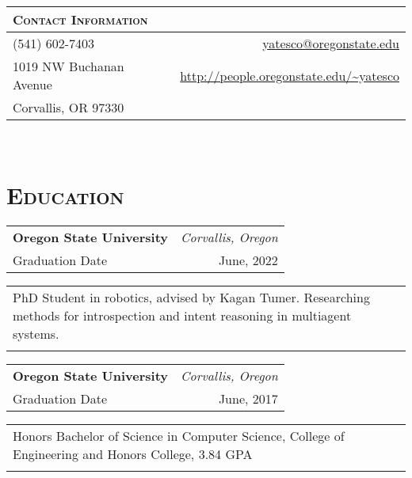 \documentclass[letterpaper,10pt,titlepage]{article}
\begin{document}
\pagestyle{empty}%
\par{\bigskip\par}%

\begin{tabularx}{\linewidth}{Xr}%
\textsc{Contact Information} & \\\hline
(541) 602-7403 & \url{yatesco@oregonstate.edu}\\
1019 NW Buchanan Avenue & \url{http://people.oregonstate.edu/\~yatesco}\\
	Corvallis, OR 97330 & \\
\end{tabularx}%
\\%


\section*{\textsc{Education}}
\begin{tabularx}{\textwidth}{Xr}
\textbf{Oregon State University} & \textit{Corvallis, Oregon} \\
Graduation Date         & June, 2022 \\
\end{tabularx}
\begin{tabularx}{\textwidth}{X}
PhD Student in robotics, advised by Kagan Tumer. Researching methods for introspection and intent reasoning in multiagent systems.\\\\
\end{tabularx}

\begin{tabularx}{\textwidth}{Xr}
\textbf{Oregon State University} & \textit{Corvallis, Oregon} \\
Graduation Date         & June, 2017 \\
\end{tabularx}
\begin{tabularx}{\textwidth}{X}
Honors Bachelor of Science in Computer Science, College of Engineering and Honors College, 3.84 GPA \\\\
\end{tabularx}
\end{document}
